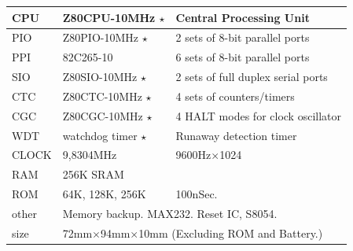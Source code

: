 \documentclass[letterpaper]{article}
\newcommand{\x}{$\times$}
\begin{document}
{    \begin{center}
        \begin{tabular}{|l|l|l|}
            \hline
            CPU   & Z80CPU-10MHz $\star$                        & Central Processing Unit            \\ \hline
            PIO   & Z80PIO-10MHz $\star$                        & 2 sets of 8-bit parallel ports     \\ \hline
            PPI   & 82C265-10                                   & 6 sets of 8-bit parallel ports     \\ \hline
            SIO   & Z80SIO-10MHz $\star$                        & 2 sets of full duplex serial ports \\ \hline
            CTC   & Z80CTC-10MHz $\star$                        & 4 sets of counters/timers          \\ \hline
            CGC   & Z80CGC-10MHz $\star$                        & 4 HALT modes for clock oscillator  \\ \hline
            WDT   & watchdog timer $\star$                      & Runaway detection timer            \\ \hline
            CLOCK & 9,8304MHz                                   & 9600Hz\x 1024                      \\ \hline
            RAM   & 256K SRAM                                   &                                    \\ \hline
            ROM   & 64K, 128K, 256K                             & 100nSec.                           \\ \hline
            other & \multicolumn{2}{l|}{Memory backup. MAX232. Reset IC, S8054.}                     \\ \hline
            size  & \multicolumn{2}{l|}{72mm\x 94mm\x 10mm (Excluding ROM and Battery.)}             \\ \hline
        \end{tabular}
    \end{center}
    }
    
\end{document}

